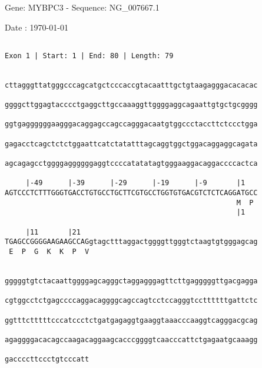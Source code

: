 \documentclass{article}
\begin{document}
\begin{center}
\begin{large}
 Gene: MYBPC3 - Sequence: NG\_007667.1
 
 Date : \today
\end{large}
\end{center}
 \begin{Verbatim}
 
Exon 1 | Start: 1 | End: 80 | Length: 79


cttagggttatgggcccagcatgctcccaccgtacaatttgctgtaagagggacacacac
                                                            
ggggcttggagtacccctgaggcttgccaaaggttggggaggcagaattgtgctgcgggg
                                                            
ggtgaggggggaagggacaggagccagccagggacaatgtggccctaccttctccctgga
                                                            
gagacctcagctctctggaattcatctatatttagcaggtggctggacaggaggcagata
                                                            
agcagagcctggggaggggggaggtccccatatatagtgggaaggacaggaccccactca
                                                            
     |-49      |-39      |-29      |-19      |-9       |1   
AGTCCCTCTTTGGGTGACCTGTGCCTGCTTCGTGCCTGGTGTGACGTCTCTCAGGATGCC
                                                       M  P 
                                                       |1  
  
     |11       |21                                          
TGAGCCGGGGAAGAAGCCAGgtagctttaggactggggttgggtctaagtgtgggagcag
 E  P  G  K  K  P  V                                        
                                                            
  
gggggtgtctacaattggggagcagggctaggagggagttcttgagggggttgacgagga
                                                            
cgtggcctctgagccccaggacaggggcagccagtcctccagggtccttttttgattctc
                                                            
ggtttctttttcccatccctctgatgagaggtgaaggtaaacccaaggtcagggacgcag
                                                            
agaggggacacagccaagacaggaagcacccggggtcaacccattctgagaatgcaaagg
                                                            
gaccccttccctgtcccatt
                    

\end{Verbatim}
\end{document}
